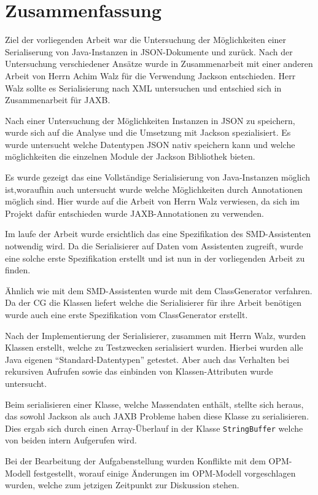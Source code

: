 \section{Zusammenfassung}
Ziel der vorliegenden Arbeit war die Untersuchung der M\"oglichkeiten einer Serialiserung von Java-Instanzen in JSON-Dokumente und zur\"uck. Nach der Untersuchung verschiedener Ans\"atze wurde in Zusammenarbeit mit einer anderen Arbeit von Herrn Achim Walz f\"ur die Verwendung Jackson entschieden. Herr Walz sollte es Serialisierung nach XML untersuchen und entschied sich in Zusammenarbeit f\"ur JAXB. \cite{Wal14}

Nach einer Untersuchung der M\"oglichkeiten Instanzen in JSON zu speichern, wurde sich auf die Analyse und die Umsetzung mit Jackson spezialisiert. Es wurde untersucht welche Datentypen JSON nativ speichern kann und welche m\"oglichkeiten die einzelnen Module der Jackson Bibliothek bieten.

Es wurde gezeigt das eine Vollst\"andige Serialisierung von Java-Instanzen m\"oglich ist,woraufhin auch untersucht wurde welche M\"oglichkeiten durch Annotationen m\"oglich sind. Hier wurde auf die Arbeit von Herrn Walz verwiesen, da sich im Projekt daf\"ur entschieden wurde JAXB-Annotationen zu verwenden.

Im laufe der Arbeit wurde ersichtlich das eine Spezifikation des \ac{SMD}-Assistenten notwendig wird. Da die Serialisierer auf Daten vom Assistenten zugreift, wurde eine solche erste Spezifikation erstellt und ist nun in der vorliegenden Arbeit zu finden.

\"Ahnlich wie mit dem \ac{SMD}-Assistenten wurde mit dem ClassGenerator verfahren. Da der \ac{CG} die Klassen liefert welche die Serialisierer f\"ur ihre Arbeit ben\"otigen wurde auch eine erste Spezifikation vom ClassGenerator erstellt.

Nach der Implementierung der Serialisierer, zusammen mit Herrn Walz, wurden Klassen erstellt, welche zu Testzwecken serialisiert wurden. Hierbei wurden alle Java eigenen "`Standard-Datentypen"' getestet. Aber auch das Verhalten bei rekursiven Aufrufen sowie das einbinden von Klassen-Attributen wurde untersucht.

Beim serialisieren einer Klasse, welche Massendaten enth\"alt, stellte sich heraus, das sowohl Jackson als auch JAXB Probleme haben diese Klasse zu serialisieren. Dies ergab sich durch einen Array-\"Uberlauf in der Klasse \texttt{StringBuffer} welche von beiden intern Aufgerufen wird.

Bei der Bearbeitung der Aufgabenstellung wurden Konflikte mit dem \ac{OPM}-Modell festgestellt, worauf einige \"Anderungen im \ac{OPM}-Modell vorgeschlagen wurden, welche zum jetzigen Zeitpunkt zur Diskussion stehen.


